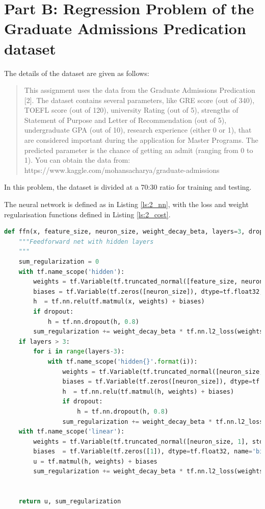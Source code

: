 \section{Part B: Regression Problem of the Graduate Admissions Predication dataset}
\label{part2}
The details of the dataset are given as follows:
\begin{quote}
This assignment uses the data from the Graduate Admissions Predication [2]. The dataset contains several parameters, like GRE score (out of 340), TOEFL score (out of 120), university Rating (out of 5), strengths of Statement of Purpose and Letter of Recommendation (out of 5), undergraduate GPA (out of 10), research experience (either 0 or 1), that are considered important during the application for Master Programs. The predicted parameter is the chance of getting an admit (ranging from 0 to 1). You can obtain the data from: https://www.kaggle.com/mohansacharya/graduate-admissions
\end{quote}

In this problem, the dataset is divided at a 70:30 ratio for training and testing.

The neural network is defined as in Listing \ref{ls:2_nn}, with the loss and weight regularisation functions defined in Listing \ref{ls:2_cost}.

\begin{lstlisting}[language=Python, caption= Feedforward neural network (layers controlled by layers parameter), label=ls:2_nn]
def ffn(x, feature_size, neuron_size, weight_decay_beta, layers=3, dropout=False):
    """Feedforward net with hidden layers
    """
    sum_regularization = 0
    with tf.name_scope('hidden'):
        weights = tf.Variable(tf.truncated_normal([feature_size, neuron_size], stddev=1.0 / np.sqrt(feature_size), dtype=tf.float32), name='weights')
        biases = tf.Variable(tf.zeros([neuron_size]), dtype=tf.float32, name='biases')
        h  = tf.nn.relu(tf.matmul(x, weights) + biases)
        if dropout:
            h = tf.nn.dropout(h, 0.8)
        sum_regularization += weight_decay_beta * tf.nn.l2_loss(weights)
    if layers > 3:
        for i in range(layers-3):
            with tf.name_scope('hidden{}'.format(i)):
                weights = tf.Variable(tf.truncated_normal([neuron_size, neuron_size], stddev=1.0 / np.sqrt(neuron_size), dtype=tf.float32), name='weights')
                biases = tf.Variable(tf.zeros([neuron_size]), dtype=tf.float32, name='biases')
                h  = tf.nn.relu(tf.matmul(h, weights) + biases)
                if dropout:
                    h = tf.nn.dropout(h, 0.8)
                sum_regularization += weight_decay_beta * tf.nn.l2_loss(weights)
    with tf.name_scope('linear'):
        weights = tf.Variable(tf.truncated_normal([neuron_size, 1], stddev=1.0 / np.sqrt(neuron_size), dtype=tf.float32), name='weights')
        biases  = tf.Variable(tf.zeros([1]), dtype=tf.float32, name='biases')
        u = tf.matmul(h, weights) + biases
        sum_regularization += weight_decay_beta * tf.nn.l2_loss(weights)


    return u, sum_regularization
\end{lstlisting}

